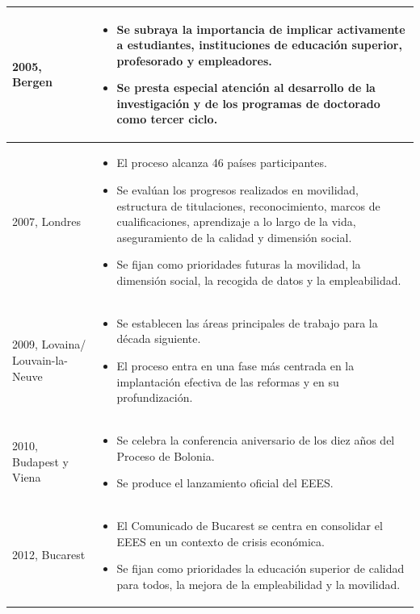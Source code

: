 \documentclass[
  letterpaper,
  DIV=11,
  numbers=noendperiod]{scrartcl}
\begin{document}
\begin{longtable*}{p{3cm} p{11.5cm}}
2005, Bergen &
\begin{itemize}
\item Se subraya la importancia de implicar activamente a estudiantes, instituciones de educación superior, profesorado y empleadores.
\item Se presta especial atención al desarrollo de la investigación y de los programas de doctorado como tercer ciclo.
\end{itemize}
\\ \hline

2007, Londres &
\begin{itemize}
\item El proceso alcanza 46 países participantes.
\item Se evalúan los progresos realizados en movilidad, estructura de titulaciones, reconocimiento, marcos de cualificaciones, aprendizaje a lo largo de la vida, aseguramiento de la calidad y dimensión social.
\item Se fijan como prioridades futuras la movilidad, la dimensión social, la recogida de datos y la empleabilidad.
\end{itemize}
\\ \hline

2009, Lovaina/ Louvain-la-Neuve &
\begin{itemize}
\item Se establecen las áreas principales de trabajo para la década siguiente.
\item El proceso entra en una fase más centrada en la implantación efectiva de las reformas y en su profundización.
\end{itemize}
\\ \hline

2010, Budapest y Viena &
\begin{itemize}
\item Se celebra la conferencia aniversario de los diez años del Proceso de Bolonia.
\item Se produce el lanzamiento oficial del EEES.
\end{itemize}
\\ \hline

2012, Bucarest &
\begin{itemize}
\item El Comunicado de Bucarest se centra en consolidar el EEES en un contexto de crisis económica.
\item Se fijan como prioridades la educación superior de calidad para todos, la mejora de la empleabilidad y la movilidad.
\end{itemize}
\\ \hline


\end{longtable*}
\end{document}
